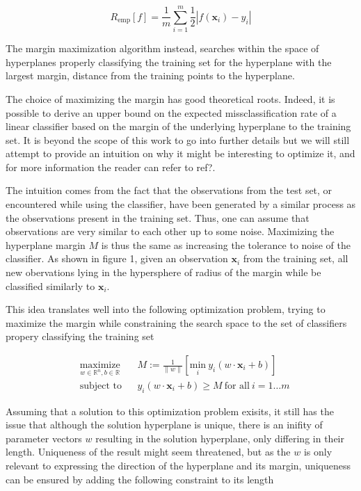 \begin{equation}
  R_{\text{emp}}[f] = \frac{1}{m}\sum^m_{i=1}\frac{1}{2}|f(\mathbf{x}_i) - y_i|
\end{equation}

The margin maximization algorithm instead, searches within the space of hyperplanes properly classifying the training set for the hyperplane with the largest margin, distance from the training points to the hyperplane.

The choice of maximizing the margin has good theoretical roots. Indeed, it is possible to derive an upper bound on the expected missclassification rate of a linear classifier based on the margin of the underlying hyperplane to the training set. It is beyond the scope of this work to go into further details but we will still attempt to provide an intuition on why it might be interesting to optimize it, and for more information the reader can refer to \textcolor[rgb]{1,0,0}{ref?}.

The intuition comes from the fact that the observations from the test set, or encountered while using the classifier, have been generated by a similar process as the observations present in the training set. Thus, one can assume that observations are very similar to each other up to some noise. Maximizing the hyperplane margin
$M$ is thus the same as increasing the tolerance to noise of the classifier. As shown in figure 1, given an observation $\mathbf{x}_i$ from the training set, all new obervations lying in the hypersphere of radius of the margin while be classified similarly to $\mathbf{x}_i$.

This idea translates well into the following optimization problem, trying to maximize the margin while constraining the search space to the set of classifiers propery classifying the training set

\begin{equation}
  \begin{aligned}
    &\underset{w \in \mathbb{R}^n, b \in \mathbb{R}} {\text{maximize}}
    & & M := \frac{1}{\|w\|} \left[\underset{i} {\text{min}}\ 
    y_i(w \cdot \mathbf{x}_i + b)\right]\\
    &\text{subject to}
    & &y_i(w \cdot \mathbf{x}_i + b) \ge M\ \text{for all}\ i = 1 \dotsc m
  \end{aligned}
\end{equation}

Assuming that a solution to this optimization problem exisits, it still has the issue that although the solution hyperplane is unique, there is an inifity of parameter vectors $w$ resulting in the solution hyperplane, only differing in their length. Uniqueness of the result might seem threatened, but as the $w$ is only relevant to expressing the direction of the hyperplane and its margin, uniqueness can be ensured by adding the following constraint to its length

